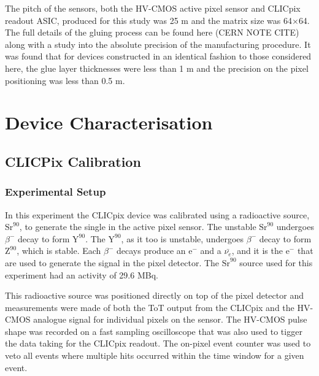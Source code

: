 The pitch of the sensors, both the HV-CMOS active pixel sensor and CLICpix readout ASIC, produced for this study was 25 {\mu}m and the matrix size was 64$\times$64.  The full details of the gluing process can be found here (CERN NOTE CITE) along with a study into the absolute precision of the manufacturing procedure.  It was found that for devices constructed in an identical fashion to those considered here, the glue layer thicknesses were less than 1 {\mu}m and the precision on the pixel positioning was less than 0.5 {\mu}m.  


\section{Device Characterisation}


\subsection{CLICPix Calibration}

\subsubsection{Experimental Setup}
In this experiment the CLICpix device was calibrated using a radioactive source, $\text{Sr}^{90}$, to generate the single in the active pixel sensor.  The unstable $\text{Sr}^{90}$ undergoes $\beta^{-}$ decay to form $\text{Y}^{90}$.  The $\text{Y}^{90}$, as it too is unstable, undergoes $\beta^{-}$ decay to form $\text{Z}^{90}$, which is stable.  Each $\beta^{-}$ decays produce an $\text{e}^{-}$ and a $\bar{\nu_{e}}$, and it is the $\text{e}^{-}$ that are used to generate the signal in the pixel detector.  The $\text{Sr}^{90}$ source used for this experiment had an activity of 29.6 MBq.  

This radioactive source was positioned directly on top of the pixel detector and measurements were made of both the ToT output from the CLICpix and the HV-CMOS analogue signal for individual pixels on the sensor.  The HV-CMOS pulse shape was recorded on a fast sampling oscilloscope that was also used to tigger the data taking for the CLICpix readout.  The on-pixel event counter was used to veto all events where multiple hits occurred within the time window for a given event.  

